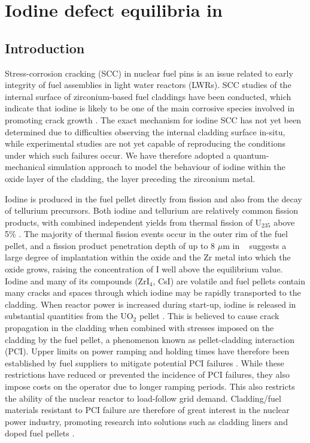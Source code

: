 \chapter{Iodine defect equilibria in \zirconia}

\label{ch:results2}

\section{Introduction}

Stress-corrosion cracking (SCC) in nuclear fuel pins is an issue related to early integrity of fuel assemblies in light water reactors (LWRs). SCC studies of the internal surface of zirconium-based fuel claddings have been conducted, which indicate that iodine is likely to be one of the main corrosive species involved in promoting crack growth \cite{rosenbaum1966interaction, bcoxpelletclad1990,fregonese2000failure,Sidky1998}. The exact mechanism for iodine SCC has not yet been determined due to difficulties observing the internal cladding surface in-situ, while experimental studies are not yet capable of reproducing the conditions under which such failures occur. We have therefore adopted a quantum-mechanical simulation approach to model the behaviour of iodine within the oxide layer of the cladding, the layer preceding the zirconium metal. 

Iodine is produced in the fuel pellet directly from fission and also from the decay of tellurium precursors. Both iodine and tellurium are relatively common fission products, with combined independent yields from thermal fission of U$_{235}$ above 5\% \cite{kennett1956mass, iodine129fissionyield, imanishi1976independent, iodinefissionyields, iodine132, amiel1975odd}. The majority of thermal fission events occur in the outer rim of the fuel pellet, and a fission product penetration depth of up to 8 $\mu$m in \zirconia\ \cite{degueldre2001behaviour} suggests a large degree of implantation within the oxide and the Zr metal into which the oxide grows, raising the concentration of I well above the equilibrium value. Iodine and many of its compounds (ZrI$_{4}$, CsI) are volatile and fuel pellets contain many cracks and spaces through which iodine may be rapidly transported to the cladding. When reactor power is increased during start-up, iodine is released in substantial quantities from the UO$_{2}$ pellet \cite{peehs1982experimental}. This is believed to cause crack propagation in the cladding when combined with stresses imposed on the cladding by the fuel pellet, a phenomenon known as pellet-cladding interaction (PCI). Upper limits on power ramping and holding times have therefore been established by fuel suppliers to mitigate potential PCI failures \cite{yagnik2005effect}. While these restrictions have reduced or prevented the incidence of PCI failures, they also impose costs on the operator due to longer ramping periods. This also restricts the ability of the nuclear reactor to load-follow grid demand. Cladding/fuel materials resistant to PCI failure are therefore of great interest in the nuclear power industry, promoting research into solutions such as cladding liners and doped fuel pellets \cite{nonon2005pci,yang2012effect}. 

